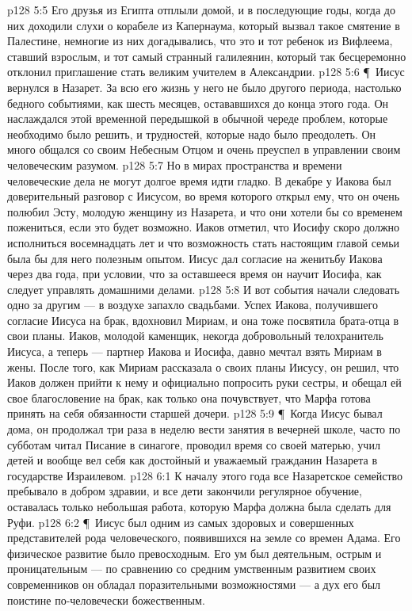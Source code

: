 \vs p128 5:5 Его друзья из Египта отплыли домой, и в последующие годы, когда до них доходили слухи о корабеле из Капернаума, который вызвал такое смятение в Палестине, немногие из них догадывались, что это и тот ребенок из Вифлеема, ставший взрослым, и тот самый странный галилеянин, который так бесцеремонно отклонил приглашение стать великим учителем в Александрии.
\vs p128 5:6 \P\ Иисус вернулся в Назарет. За всю его жизнь у него не было другого периода, настолько бедного событиями, как шесть месяцев, остававшихся до конца этого года. Он наслаждался этой временной передышкой в обычной череде проблем, которые необходимо было решить, и трудностей, которые надо было преодолеть. Он много общался со своим Небесным Отцом и очень преуспел в управлении своим человеческим разумом.
\vs p128 5:7 Но в мирах пространства и времени человеческие дела не могут долгое время идти гладко. В декабре у Иакова был доверительный разговор с Иисусом, во время которого открыл ему, что он очень полюбил Эсту, молодую женщину из Назарета, и что они хотели бы со временем пожениться, если это будет возможно. Иаков отметил, что Иосифу скоро должно исполниться восемнадцать лет и что возможность стать настоящим главой семьи была бы для него полезным опытом. Иисус дал согласие на женитьбу Иакова через два года, при условии, что за оставшееся время он научит Иосифа, как следует управлять домашними делами.
\vs p128 5:8 И вот события начали следовать одно за другим --- в воздухе запахло свадьбами. Успех Иакова, получившего согласие Иисуса на брак, вдохновил Мириам, и она тоже посвятила брата\hyp{}отца в свои планы. Иаков, молодой каменщик, некогда добровольный телохранитель Иисуса, а теперь --- партнер Иакова и Иосифа, давно мечтал взять Мириам в жены. После того, как Мириам рассказала о своих планы Иисусу, он решил, что Иаков должен прийти к нему и официально попросить руки сестры, и обещал ей свое благословение на брак, как только она почувствует, что Марфа готова принять на себя обязанности старшей дочери.
\vs p128 5:9 \P\ Когда Иисус бывал дома, он продолжал три раза в неделю вести занятия в вечерней школе, часто по субботам читал Писание в синагоге, проводил время со своей матерью, учил детей и вообще вел себя как достойный и уважаемый гражданин Назарета в государстве Израилевом.
\vs p128 6:1 К началу этого года все Назаретское семейство пребывало в добром здравии, и все дети закончили регулярное обучение, оставалась только небольшая работа, которую Марфа должна была сделать для Руфи.
\vs p128 6:2 \P\ Иисус был одним из самых здоровых и совершенных представителей рода человеческого, появившихся на земле со времен Адама. Его физическое развитие было превосходным. Его ум был деятельным, острым и проницательным --- по сравнению со средним умственным развитием своих современников он обладал поразительными возможностями --- а дух его был поистине по\hyp{}человечески божественным.
